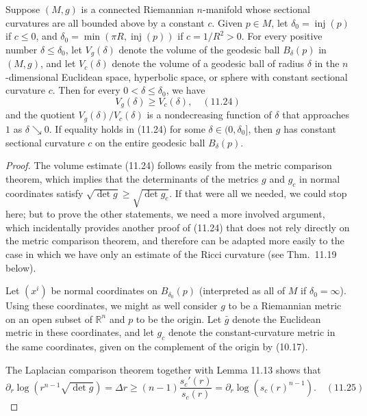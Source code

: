 \begin{theorem}
\label{thm:gunther-volume-comparison}

Suppose $(M,g)$ is a connected Riemannian $n$-manifold whose sectional curvatures are all bounded above by a constant $c$. Given $p \in M$, let $\delta_0 = \operatorname{inj}(p)$ if $c \le 0$, and $\delta_0 = \min(\pi R, \operatorname{inj}(p))$ if $c = 1/R^2 > 0$. For every positive number $\delta \le \delta_0$, let $V_g(\delta)$ denote the volume of the geodesic ball $B_\delta(p)$ in $(M,g)$, and let $V_c(\delta)$ denote the volume of a geodesic ball of radius $\delta$ in the $n$-dimensional Euclidean space, hyperbolic space, or sphere with constant sectional curvature $c$. Then for every $0 < \delta \le \delta_0$, we have
\[
V_g(\delta) \ge V_c(\delta), \quad (11.24)
\]
and the quotient $V_g(\delta)/V_c(\delta)$ is a nondecreasing function of $\delta$ that approaches $1$ as $\delta \searrow 0$. If equality holds in (11.24) for some $\delta \in (0, \delta_0]$, then $g$ has constant sectional curvature $c$ on the entire geodesic ball $B_\delta(p)$.

\begin{proof}
The volume estimate (11.24) follows easily from the metric comparison theorem, which implies that the determinants of the metrics $g$ and $g_c$ in normal coordinates satisfy $\sqrt{\det g} \ge \sqrt{\det g_c}$. If that were all we needed, we could stop here; but to prove the other statements, we need a more involved argument, which incidentally provides another proof of (11.24) that does not rely directly on the metric comparison theorem, and therefore can be adapted more easily to the case in which we have only an estimate of the Ricci curvature (see Thm.\ 11.19 below).

Let $(x^i)$ be normal coordinates on $B_{\delta_0}(p)$ (interpreted as all of $M$ if $\delta_0 = \infty$). Using these coordinates, we might as well consider $g$ to be a Riemannian metric on an open subset of $\mathbb{R}^n$ and $p$ to be the origin. Let $\bar{g}$ denote the Euclidean metric in these coordinates, and let $g_c$ denote the constant-curvature metric in the same coordinates, given on the complement of the origin by (10.17).

The Laplacian comparison theorem together with Lemma 11.13 shows that
\[
\partial_r \log(r^{n-1}\sqrt{\det g}) = \Delta r \ge (n-1) \frac{s_c'(r)}{s_c(r)} = \partial_r \log(s_c(r)^{n-1}). \quad (11.25)
\]


\end{proof}
\end{theorem}
